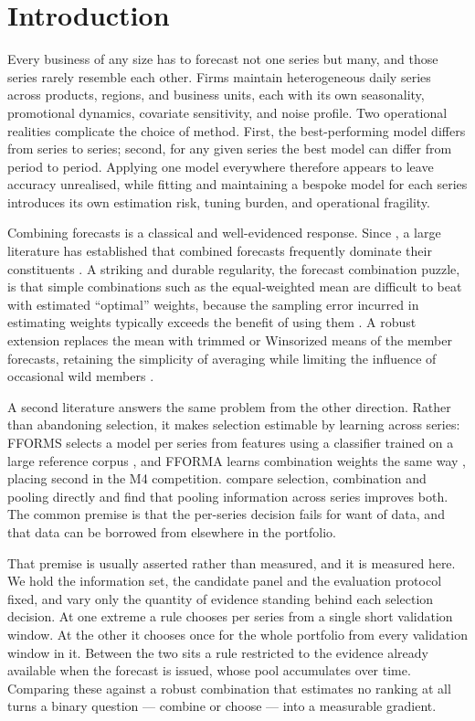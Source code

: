 \documentclass[11pt]{article}
\begin{document}
\section{Introduction}

Every business of any size has to forecast not one series but many, and those series rarely resemble each other. Firms maintain heterogeneous daily series across products, regions, and business units, each with its own seasonality, promotional dynamics, covariate sensitivity, and noise profile. Two operational realities complicate the choice of method. First, the best-performing model differs from series to series; second, for any given series the best model can differ from period to period. Applying one model everywhere therefore appears to leave accuracy unrealised, while fitting and maintaining a bespoke model for each series introduces its own estimation risk, tuning burden, and operational fragility.

Combining forecasts is a classical and well-evidenced response. Since \citet{bates1969}, a large literature has established that combined forecasts frequently dominate their constituents \citep{clemen1989,timmermann2006,wang2023}. A striking and durable regularity, the forecast combination puzzle, is that simple combinations such as the equal-weighted mean are difficult to beat with estimated ``optimal'' weights, because the sampling error incurred in estimating weights typically exceeds the benefit of using them \citep{stock2004,smith2009}. A robust extension replaces the mean with trimmed or Winsorized means of the member forecasts, retaining the simplicity of averaging while limiting the influence of occasional wild members \citep{jose2008,kourentzes2019}.

A second literature answers the same problem from the other direction. Rather than abandoning selection, it makes selection estimable by learning across series: FFORMS selects a model per series from features using a classifier trained on a large reference corpus \citep{talagala2023}, and FFORMA learns combination weights the same way \citep{montero2020}, placing second in the M4 competition. \citet{kourentzes2019} compare selection, combination and pooling directly and find that pooling information across series improves both. The common premise is that the per-series decision fails for want of data, and that data can be borrowed from elsewhere in the portfolio.

That premise is usually asserted rather than measured, and it is measured here. We hold the information set, the candidate panel and the evaluation protocol fixed, and vary only the quantity of evidence standing behind each selection decision. At one extreme a rule chooses per series from a single short validation window. At the other it chooses once for the whole portfolio from every validation window in it. Between the two sits a rule restricted to the evidence already available when the forecast is issued, whose pool accumulates over time. Comparing these against a robust combination that estimates no ranking at all turns a binary question --- combine or choose --- into a measurable gradient.
\end{document}
